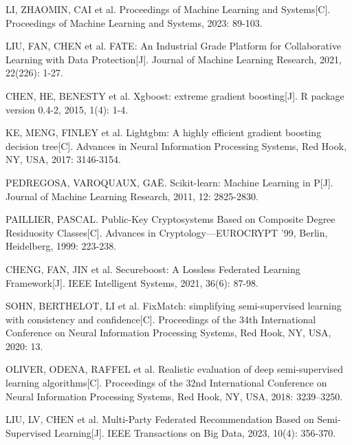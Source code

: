 \begin{thebibliography}{200}
	LI, ZHAOMIN, CAI et al. Proceedings of Machine Learning and Systems[C]. Proceedings of Machine Learning and Systems, 2023: 89-103.
	
	LIU, FAN, CHEN et al. FATE: An Industrial Grade Platform for Collaborative Learning with Data Protection[J]. Journal of Machine Learning Research, 2021, 22(226): 1-27.
	
	CHEN, HE, BENESTY et al. Xgboost: extreme gradient boosting[J]. R package version 0.4-2, 2015, 1(4): 1-4.
	
	KE, MENG, FINLEY et al. Lightgbm: A highly efficient gradient boosting decision tree[C]. Advances in Neural Information Processing Systems, Red Hook, NY, USA, 2017: 3146-3154.
	
	PEDREGOSA, VAROQUAUX, GA\"E. Scikit-learn: Machine Learning in P[J]. Journal of Machine Learning Research, 2011, 12: 2825-2830.
	
	PAILLIER, PASCAL. Public-Key Cryptosystems Based on Composite Degree Residuosity Classes[C]. Advances in Cryptology---EUROCRYPT '99, Berlin, Heidelberg, 1999: 223-238.
	
	CHENG, FAN, JIN et al. Secureboost: A Lossless Federated Learning Framework[J]. IEEE Intelligent Systems, 2021, 36(6): 87-98.
	
	SOHN, BERTHELOT, LI et al. FixMatch: simplifying semi-supervised learning with consistency and confidence[C]. Proceedings of the 34th International Conference on Neural Information Processing Systems, Red Hook, NY, USA, 2020: 13.
	
	OLIVER, ODENA, RAFFEL et al. Realistic evaluation of deep semi-supervised learning algorithms[C]. Proceedings of the 32nd International Conference on Neural Information Processing Systems, Red Hook, NY, USA, 2018: 3239–3250.
	
	LIU, LV, CHEN et al. Multi-Party Federated Recommendation Based on Semi-Supervised Learning[J]. IEEE Transactions on Big Data, 2023, 10(4): 356-370.
	
\end{thebibliography}
\clearpage

